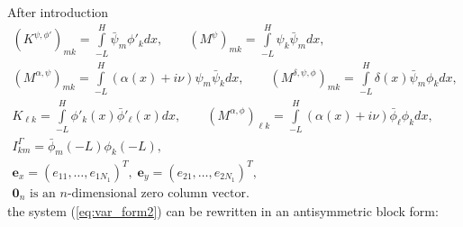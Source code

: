 After introduction 
\begin{align*}
\left(K^{\psi,\phi'}\right)_{mk}=\int\limits_{-L}^{H}\bar{\psi}_{m}\phi'_{k}dx,\qquad \left(M^{\psi}\right)_{mk}=\int\limits_{-L}^{H}\psi_{k}\bar{\psi}_{m}dx,\\
\left(M^{\alpha,\psi}\right)_{mk}=\int\limits_{-L}^{H}(\alpha(x)+i\nu)\psi_{m}\bar{\psi}_{k}dx, \qquad \left(M^{\delta,\psi,\phi}\right)_{mk}=\int\limits_{-L}^{H}\delta(x)\bar{\psi}_{m}\phi_{k}dx,\\
K_{\ell k}=\int\limits_{-L}^{H}\phi'_{k}(x)\bar{\phi}'_{\ell}(x)dx,\qquad \left(M^{\alpha,\phi}\right)_{\ell k}=\int\limits_{-L}^{H}(\alpha(x)+i\nu)\bar{\phi}_{\ell}\phi_{k}dx,\\
I_{km}^{\Gamma}=\bar{\phi}_{m}(-L)\phi_{k}(-L),\\
\boldsymbol{e}_{x}=\left(e_{11},\ldots,e_{1 N_{1}}\right)^{T},\; \boldsymbol{e}_{y}=\left(e_{21},\ldots,e_{2 N_{1}}\right)^{T},\\
\boldsymbol{0}_{n} \text{ is an $n$-dimensional zero column vector}.
\end{align*}
the system (\ref{eq:var_form2}) can be rewritten in an antisymmetric block form:
